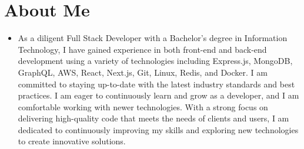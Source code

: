 \section{About Me}

\vspace{3pt}
\begin{itemize} [label={}, leftmargin=4pt, ]
    \item{As a diligent Full Stack Developer with a Bachelor's degree in Information Technology, I have gained experience in both front-end and back-end development using a variety of technologies including Express.js, MongoDB, GraphQL, AWS, React, Next.js, Git, Linux, Redis, and Docker. I am committed to staying up-to-date with the latest industry standards and best practices. I am eager to continuously learn and grow as a developer, and I am comfortable working with newer technologies. With a strong focus on delivering high-quality code that meets the needs of clients and users, I am dedicated to continuously improving my skills and exploring new technologies to create innovative solutions.}
\end{itemize}
